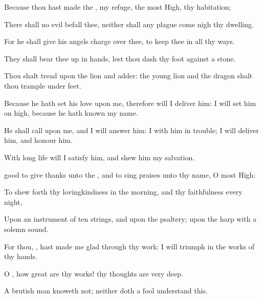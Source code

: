 {\Q {}Because thou hast
made the
{},
{} my
refuge,
{} the most
High, thy
habitation;


\par }{\Q {}There shall no
evil
befall thee, neither shall any
plague come
nigh thy
dwelling.


\par }{\Q {}For he shall give his
angels
charge over thee, to
keep thee in all thy
ways.


\par }{\Q {}They shall bear thee
up in
{}
hands, lest thou
dash thy
foot against a
stone.


\par }{\Q {}Thou shalt
tread upon the
lion and
adder: the young
lion and the
dragon shalt thou trample under
feet.


\par }{\Q {}Because he hath set his
love upon me, therefore will I
deliver him: I will set him on
high, because he hath
known my
name.


\par }{\Q {}He shall
call upon me, and I will
answer him: I
{} with him in
trouble; I will
deliver him, and
honour him.


\par }{\Q {}With
long
life will I
satisfy him, and
shew him my
salvation.




\par }
{\Q {}
good
{} to give
thanks unto the
{}, and to sing
praises unto thy
name, O most
High:


\par }{\Q {}To shew
forth thy
lovingkindness in the
morning, and thy
faithfulness every
night,


\par }{\Q {}Upon an instrument of ten
strings, and upon the
psaltery; upon the
harp with a solemn
sound.


\par }{\Q {}For thou,
{}, hast made me
glad through thy
work: I will
triumph in the
works of thy
hands.


\par }{\Q {}O
{}, how
great are thy
works!
{} thy
thoughts are
very
deep.


\par }{\Q {}A
brutish
man
knoweth not; neither doth a
fool
understand this.


\par }{\BB \par }

